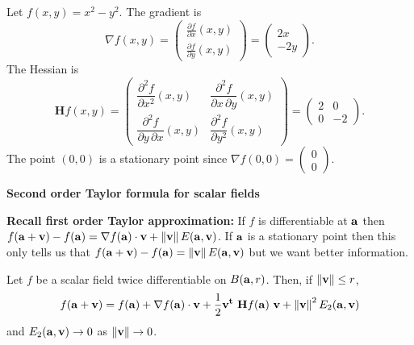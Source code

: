 \begin{example}
    Let \(f(x,y)=x^2-y^2\).
    The gradient is
    \[\nabla f(x,y) =\begin{pmatrix}
            \frac{\partial f}{\partial x} (x,y) \\[2.2ex]
            \frac{\partial f}{\partial y} (x,y)
        \end{pmatrix} =   \begin{pmatrix}
            2x \\-2y
        \end{pmatrix}.
    \]
    The Hessian is
    \[
        \mathbf{H} f (x,y)= \begin{pmatrix}
            \dfrac{\partial^2 f}{\partial x^2} (x,y)
             & \dfrac{\partial^2 f}{\partial x\,\partial y} (x,y)
            \\[2.2ex]
            \dfrac{\partial^2 f}{\partial y\,\partial x} (x,y)
             & \dfrac{\partial^2 f}{\partial y^2}(x,y)
        \end{pmatrix}
        = \begin{pmatrix}
            2
             & 0
            \\[2.2ex]
            0
             & -2
        \end{pmatrix}.
    \]
    The point \((0,0)\) is a stationary point since \(\nabla f(0,0) =\left(\begin{smallmatrix}
            0\\0
        \end{smallmatrix}\right) \).
\end{example}




\textbf{Second order Taylor formula for scalar fields}

\textbf{Recall first order Taylor approximation:}
If \(f\) is differentiable at \(\aa\)
then
\(  f(\aa+  \vv) - f(\aa)  = \nabla f(\aa) \cdot \vv + \norm{\vv}E(\aa,\vv)\).
If \(\aa\) is a stationary point then this only tells us that \(  f(\aa+  \vv) - f(\aa)  =  \norm{\vv}E(\aa,\vv)\) but we want better information.

\begin{theorem}
    Let \(f\) be a scalar field twice differentiable on \(B(\aa,r)\).
    Then, if \(\norm{\vv}\leq r\),
    \[
        f(\aa+\vv) = f(\aa) + \nabla f(\aa) \cdot \vv + \frac{1}{2} \vv^{\mathbf{t}} \ \mathbf{H} f (\aa) \ \vv + \norm{\vv}^2 E_2(\aa,\vv)
    \]
    and \(E_2(\aa,\vv) \to 0\) as \(\norm{\vv}\to 0\).
\end{theorem}




